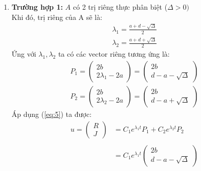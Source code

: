 \documentclass[a4paper]{article}
\begin{document}
\begin{enumerate}
    \item \textbf{Trường hợp 1:} $A$ có 2 trị riêng thực phân biệt ($\Delta > 0)$\\
    Khi đó, trị riêng của A sẽ là:
    \begin{equation} \label{eq:7}
    \begin{split}
         \lambda_1 = \frac{a+d - \sqrt{\Delta}}{2} \\ \lambda_2 = \frac{a+d + \sqrt{\Delta}}{2}
    \end{split}
    \end{equation}
    Ứng với $\lambda_1,\lambda_2$ ta có các vector riêng tương ứng là:
    \begin{equation} \label{eq:8}
    \begin{split}
         P_1 = \begin{pmatrix}
             2b \\
             2\lambda_1 - 2a
         \end{pmatrix} = 
         \begin{pmatrix}
             2b \\
             d - a -\sqrt{\Delta}
         \end{pmatrix} \\
         P_2 = \begin{pmatrix}
             2b \\
             2\lambda_2 - 2a
         \end{pmatrix} = 
         \begin{pmatrix}
             2b \\
             d - a +\sqrt{\Delta}
         \end{pmatrix}
    \end{split}
    \end{equation}
    Áp dụng (\ref{eq:5}) ta được:
    \begin{equation} \label{eq:9}
        \begin{split}
            u=\begin{pmatrix}
                R \\
                J
            \end{pmatrix}
            &=C_1e^{\lambda_1 t}P_1+C_2e^{\lambda_2 t}P_2 \\ \\
            &= C_1e^{\lambda_1 t}\begin{pmatrix}
                2b \\
             d - a -\sqrt{\Delta}

\end{pmatrix}
\end{split}
\end{equation}
\end{enumerate}
\end{document}
